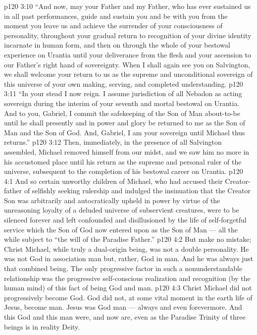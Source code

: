 \vs p120 3:10 “And now, may your Father and my Father, who has ever sustained us in all past performances, guide and sustain you and be with you from the moment you leave us and achieve the surrender of your consciousness of personality, throughout your gradual return to recognition of your divine identity incarnate in human form, and then on through the whole of your bestowal experience on Urantia until your deliverance from the flesh and your ascension to our Father’s right hand of sovereignty. When I shall again see you on Salvington, we shall welcome your return to us as the supreme and unconditional sovereign of this universe of your own making, serving, and completed understanding.
\vs p120 3:11 “In your stead I now reign. I assume jurisdiction of all Nebadon as acting sovereign during the interim of your seventh and mortal bestowal on Urantia. And to you, Gabriel, I commit the safekeeping of the Son of Man about\hyp{}to\hyp{}be until he shall presently and in power and glory be returned to me as the Son of Man and the Son of God. And, Gabriel, I am your sovereign until Michael thus returns.”
\separatorshort
\vs p120 3:12 Then, immediately, in the presence of all Salvington assembled, Michael removed himself from our midst, and we saw him no more in his accustomed place until his return as the supreme and personal ruler of the universe, subsequent to the completion of his bestowal career on Urantia.
\vs p120 4:1 And so certain unworthy children of Michael, who had accused their Creator\hyp{}father of selfishly seeking rulership and indulged the insinuation that the Creator Son was arbitrarily and autocratically upheld in power by virtue of the unreasoning loyalty of a deluded universe of subservient creatures, were to be silenced forever and left confounded and disillusioned by the life of self\hyp{}forgetful service which the Son of God now entered upon as the Son of Man --- all the while subject to “the will of the Paradise Father.”
\vs p120 4:2 \pc But make no mistake; Christ Michael, while truly a dual\hyp{}origin being, was not a double personality. He was not God in association  man but, rather, God  in man. And he was always just that combined being. The only progressive factor in such a nonunderstandable relationship was the progressive self\hyp{}conscious realization and recognition (by the human mind) of this fact of being God and man.
\vs p120 4:3 Christ Michael did not progressively become God. God did not, at some vital moment in the earth life of Jesus, become man. Jesus was God  man --- always and even forevermore. And this God and this man were, and now are,  even as the Paradise Trinity of three beings is in reality  Deity.

